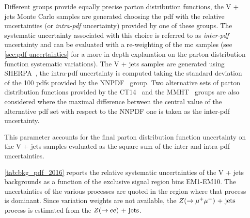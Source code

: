 Different groups provide equally precise parton distribution functions, the V +
jets Monte Carlo samples are generated choosing the \gls{pdf} with the relative
uncertainties (or \emph{intra-\gls{pdf}} uncertainty) provided by one of these
groups. The systematic uncertainty associated with this choice is referred to as
\emph{inter-\gls{pdf}} uncertainty and can be evaluated with a re-weighting of
the \gls{mc} samples (see \cref{sec:pdf-uncertainties} for a more in-depth
explanation on the parton distribution function systematic variations). The V +
jets samples are generated using SHERPA~\cite{SHERPAGenerator}, the
intra-\gls{pdf} uncertainty is computed taking the standard deviation of the 100
\glspl{pdf} provided by the NNPDF~\cite{NNPDF} group. Two alternative sets of
parton distribution functions provided by the CT14~\cite{CT14PDF} and the
MMHT~\cite{MMHT} groups are also considered where the maximal difference between
the central value of the alternative \gls{pdf} set with respect to the NNPDF one
is taken as the inter-\gls{pdf} uncertainty.
\begin{description}[font=\normalfont]
\item[PDFComb:] This parameter accounts for the final parton distribution
  function uncertainty on the V + jets samples evaluated as the square sum of
  the inter and intra-\gls{pdf} uncertainties.
\end{description}
\cref{tab:bkg_pdf_2016} reports the relative systematic uncertainties of the V +
jets backgrounds as a function of the exclusive signal region bins EM1-EM10. The
uncertainties of the various processes are quoted in the region where that
process is dominant. Since variation weights are not available, the
$Z (\rightarrow \mu^+ \mu^-)\mathrm{~+~jets}$ process is estimated from the $Z (\rightarrow e e)\mathrm{~+~jets}$.
